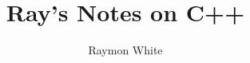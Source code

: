 \documentclass[12pt]{muthesis}
\begin{document}
\title{Ray's Notes on C++}
\author{Raymon White}

%


\tablespagefalse

\figurespagefalse



\beforeabstract

%





%

\afterpreface

%




%

%

%

%
\end{document}
